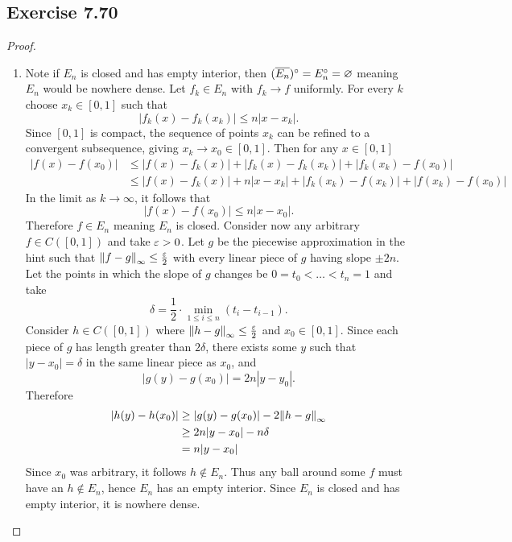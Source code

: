 \documentclass[hw_all.tex]{subfiles}
\begin{document}
\subsection{Exercise 7.70}
\begin{proof}
    \begin{enumerate}
        \item 
            Note if $E_n$ is closed and has empty interior, then $(\overline{E_n})^\circ = E_n^\circ = \varnothing$ meaning $E_n$ would be nowhere dense. Let $f_k \in E_n$ with $f_k \to f$ uniformly. For every $k$ choose $x_k \in [0,1]$ such that
            \[
                |f_k(x) - f_k(x_k)| \leq n |x - x_k|
            .\]
            Since $[0,1]$ is compact, the sequence of points $x_k$ can be refined to a convergent subsequence, giving $x_k \to x_0 \in [0,1]$. Then for any $x \in [0,1]$
            \begin{align*}
                |f(x) - f(x_0)| &\leq |f(x) - f_k(x)| + |f_k(x) - f_k(x_k)| + |f_k(x_k) - f(x_0)| \\
                                &\leq |f(x) - f_k(x)| + n|x-x_k| + |f_k(x_k) - f(x_k)| + |f(x_k) - f(x_0)|
            \end{align*}
            In the limit as $k \to \infty$, it follows that
            \[
                |f(x) - f(x_0)| \leq n|x - x_0|
            .\]
            Therefore $f \in E_n$ meaning $E_n$ is closed. Consider now any arbitrary $f \in C([0,1])$ and take $\varepsilon > 0$. Let $g$ be the piecewise approximation in the hint such that $\norm{f - g}_{\infty} \leq \frac{\varepsilon}{2}$ with every linear piece of $g$ having slope $\pm 2n$. Let the points in which the slope of $g$ changes be $0 = t_0 < \ldots < t_n = 1$ and take
            \[
                \delta = \frac{1}{2} \cdot \min_{1 \leq i \leq n} (t_i - t_{i - 1})
            .\]
            Consider $h \in C([0,1])$ where $\norm{h - g}_{\infty} \leq \frac{\varepsilon}{2}$ and $x_0 \in [0,1]$. Since each piece of $g$ has length greater than $2 \delta$, there exists some $y$ such that $|y - x_0| = \delta$ in the same linear piece as $x_0$, and
            \[
                |g(y) - g(x_0)| = 2n|y-y_0|
            .\]
            Therefore
            \begin{align*}
                |h(y) - h(x_0)| &\geq |g(y) - g(x_0)| - 2 \norm{h-g}_{\infty}  \\
                                &\geq 2n|y-x_0| - n \delta \\
                                &=n|y-x_0|
            \end{align*}
            Since $x_0$ was arbitrary, it follows $h \notin E_n$. Thus any ball around some $f$ must have an $h \notin E_n$, hence $E_n$ has an empty interior. Since $E_n$ is closed and has empty interior, it is nowhere dense.


\end{enumerate}
\end{proof}
\end{document}
